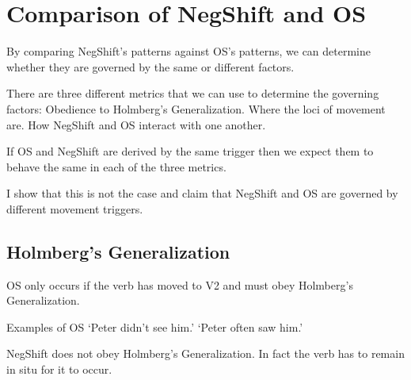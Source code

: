 \documentclass[12pt, letterpaper]{article}
\begin{document}
\section{Comparison of NegShift and OS} \label{sec:Comparison}

\ea By comparing NegShift's patterns against OS's patterns, we can determine whether they are governed by the same or different factors. 

\ex There are three different metrics that we can use to determine the governing factors:
	\ea Obedience to Holmberg's Generalization.
	\ex Where the loci of movement are.
	\ex How NegShift and OS interact with one another.   
	\z 

\ex If OS and NegShift are derived by the same trigger then we expect them to behave the same in each of the three metrics.

\ex I show that this is not the case and claim that NegShift and OS are governed by different movement triggers. 
\z 

\subsection{Holmberg's Generalization} \label{sec:HG}
\ea OS only occurs if the verb has moved to V2 and must obey Holmberg's Generalization.

 
\z

\ex Examples of OS 
    \glt `Peter didn't see him.' \label{ex:classic}
    \glt `Peter often saw him.' \label{ex:oft}
	\z 

\ex NegShift does not obey Holmberg's Generalization. In fact the verb has to remain in situ for it to occur. 
\end{document}
